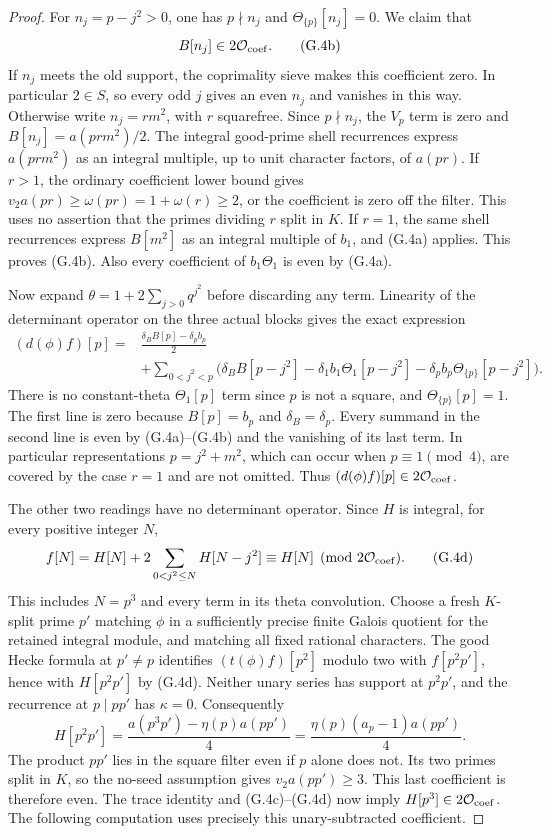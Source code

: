\documentclass[11pt]{article}
\theoremstyle{definition}
\theoremstyle{remark}
\begin{document}
\begin{proof}
For $n_j=p-j^2>0$, one has $p\nmid n_j$ and
$\Theta_{\{p\}}[n_j]=0$.  We claim that
\[
                           B[n_j]\in2\mathcal O_{\rm coef}.    \tag{G.4b}
\]
If $n_j$ meets the old support, the coprimality sieve makes this
coefficient zero.  In particular $2\in S$, so every odd $j$ gives
an even $n_j$ and vanishes in this way.  Otherwise write
$n_j=r m^2$, with $r$ squarefree.
Since $p\nmid n_j$, the $V_p$ term is zero and
$B[n_j]=a(prm^2)/2$.  The integral good-prime shell recurrences
express $a(prm^2)$ as an integral multiple, up to unit character
factors, of $a(pr)$.  If $r>1$, the ordinary coefficient lower
bound gives $v_2a(pr)\ge\omega(pr)=1+\omega(r)\ge2$, or the
coefficient is zero off the filter.  This uses no assertion that
the primes dividing $r$ split in $K$.  If $r=1$, the same shell
recurrences express $B[m^2]$ as an integral multiple of $b_1$,
and (G.4a) applies.  This proves (G.4b).  Also every coefficient
of $b_1\Theta_1$ is even by (G.4a).

Now expand $\theta=1+2\sum_{j>0}q^{j^2}$ before discarding any
term.  Linearity of the determinant operator on the three actual
blocks gives the exact expression
\[
\begin{split}
 (d(\phi)f)[p]
 ={}&\frac{\delta_B B[p]-\delta_p b_p}{2}\\
 &+\sum_{0<j^2<p}
 \bigl(\delta_B B[p-j^2]
       -\delta_1 b_1\Theta_1[p-j^2]
       -\delta_p b_p\Theta_{\{p\}}[p-j^2]\bigr).
\end{split}                                                     \tag{G.4c}
\]
There is no constant-theta $\Theta_1[p]$ term since $p$ is not
a square, and $\Theta_{\{p\}}[p]=1$.
The first line is zero because $B[p]=b_p$ and
$\delta_B=\delta_p$.  Every summand in the second line is even
by (G.4a)--(G.4b) and the vanishing of its last term.  In particular
representations $p=j^2+m^2$, which can occur when $p\equiv1\pmod4$,
are covered by the case $r=1$ and are not omitted.  Thus
$(d(\phi)f)[p]\in2\mathcal O_{\rm coef}$.

The other two readings have no determinant operator.  Since $H$
is integral, for every positive integer $N$,
\[
 f[N]=H[N]+2\sum_{0<j^2\le N}H[N-j^2]
                 \equiv H[N]\pmod{2\mathcal O_{\rm coef}}.     \tag{G.4d}
\]
This includes $N=p^3$ and every term in its theta convolution.
Choose a fresh $K$-split prime $p'$ matching $\phi$ in a sufficiently
precise finite Galois quotient for the retained integral module,
and matching all fixed rational characters.  The good Hecke formula
at $p'\ne p$ identifies $(t(\phi)f)[p^2]$ modulo two with
$f[p^2p']$, hence with $H[p^2p']$ by (G.4d).
Neither unary series has support at $p^2p'$, and the recurrence at
$p\mid pp'$ has $\kappa=0$.  Consequently
\[
 H[p^2p']=\frac{a(p^3p')-\eta(p)a(pp')}{4}
        =\frac{\eta(p)(a_p-1)a(pp')}{4}.
\]
The product $pp'$ lies in the square filter even if $p$ alone does
not.  Its two primes split in $K$, so the no-seed assumption gives
$v_2a(pp')\ge3$.  This last coefficient is therefore even.
The trace identity and (G.4c)--(G.4d) now imply
$H[p^3]\in2\mathcal O_{\rm coef}$.  The following computation
uses precisely this unary-subtracted coefficient.


\end{proof}
\end{document}
